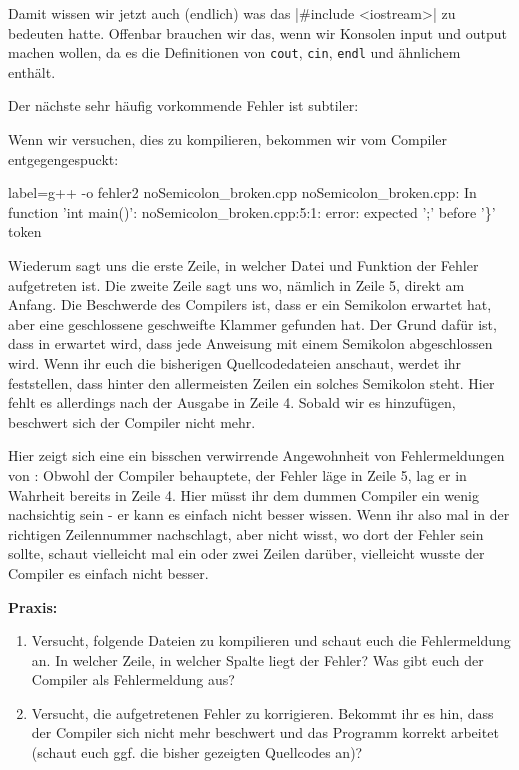 Damit wissen wir jetzt auch (endlich) was das |#include <iostream>|
zu bedeuten hatte. Offenbar brauchen wir das, wenn wir Konsolen input und
output machen wollen, da es die Definitionen von \texttt{cout}, \texttt{cin},
\texttt{endl} und ähnlichem enthält.

Der nächste sehr häufig vorkommende Fehler ist subtiler:


Wenn wir versuchen, dies zu kompilieren, bekommen wir vom Compiler
entgegengespuckt:

\begin{textcode*}{label=g++ -o fehler2 noSemicolon\_broken.cpp}
	noSemicolon\_broken.cpp: In function 'int main()':
	noSemicolon\_broken.cpp:5:1: error: expected ';' before '\}' token
\end{textcode*}

Wiederum sagt uns die erste Zeile, in welcher Datei und Funktion der Fehler
aufgetreten ist. Die zweite Zeile sagt uns wo, nämlich in Zeile 5, direkt am
Anfang. Die Beschwerde des Compilers ist, dass er ein Semikolon erwartet hat,
aber eine geschlossene geschweifte Klammer gefunden hat. Der Grund dafür ist,
dass in \Cpp erwartet wird, dass jede Anweisung mit einem Semikolon abgeschlossen
wird.  Wenn ihr euch die bisherigen Quellcodedateien anschaut, werdet ihr
feststellen, dass hinter den allermeisten Zeilen ein solches Semikolon steht.
Hier fehlt es allerdings nach der Ausgabe in Zeile 4. Sobald wir es hinzufügen,
beschwert sich der Compiler nicht mehr.

Hier zeigt sich eine ein bisschen verwirrende Angewohnheit von Fehlermeldungen
von \Cpp: Obwohl der Compiler behauptete, der Fehler läge in Zeile 5, lag er in
Wahrheit bereits in Zeile 4. Hier müsst ihr dem dummen Compiler ein wenig
nachsichtig sein - er kann es einfach nicht besser wissen. Wenn ihr also mal in
der richtigen Zeilennummer nachschlagt, aber nicht wisst, wo dort der Fehler
sein sollte, schaut vielleicht mal ein oder zwei Zeilen darüber, vielleicht
wusste der Compiler es einfach nicht besser.

\textbf{Praxis:}
\begin{enumerate}
	\item Versucht, folgende Dateien zu kompilieren und schaut euch die
	      Fehlermeldung an. In welcher Zeile, in welcher Spalte liegt der Fehler?
	      Was gibt euch der Compiler als Fehlermeldung aus?
	\item Versucht, die aufgetretenen Fehler zu korrigieren. Bekommt ihr es
	      hin, dass der Compiler sich nicht mehr beschwert und das Programm
	      korrekt arbeitet (schaut euch ggf. die bisher gezeigten Quellcodes an)?
\end{enumerate}

